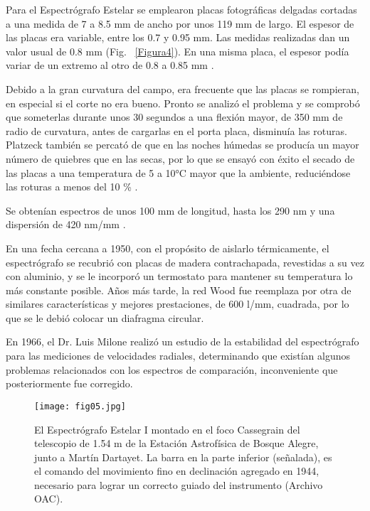 \documentclass[baaa]{baaa}
\begin{document}
Para el Espectrógrafo Estelar se emplearon placas fotográficas delgadas cortadas a una medida de 7 a 8.5 mm de ancho por unos 119 mm de largo. El espesor de las placas era variable, entre los 0.7 y 0.95 mm. Las medidas realizadas dan un valor usual de 0.8 mm (Fig. ~\ref{Figura4}). En una misma placa, el espesor podía variar de un extremo al otro de 0.8 a 0.85 mm \citep{1946RvAst..18..243G}. 

Debido a la gran curvatura del campo, era frecuente que las placas se rompieran, en especial si el corte no era bueno. Pronto se analizó el problema y se comprobó que someterlas durante unos 30 segundos a una flexión mayor, de 350 mm de radio de curvatura, antes de cargarlas en el porta placa, disminuía las roturas. Platzeck también se percató de que en las noches húmedas se producía un mayor número de quiebres que en las secas, por lo que se ensayó con éxito el secado de las placas a una temperatura de 5 a 10°C mayor que la ambiente, reduciéndose las roturas a menos del 10 \% \citep{1946RvAst..18..243G}.

Se obtenían espectros de unos 100 mm de longitud, hasta los 290 nm y una dispersión de 420 nm/mm \citep{1942RvA....14..207G}.

En una fecha cercana a 1950, con el propósito de aislarlo térmicamente, el espectrógrafo se recubrió con placas de madera contrachapada, revestidas a su vez con aluminio, y se le incorporó un termostato para mantener su temperatura lo más constante posible. Años más tarde, la red Wood fue reemplaza por otra de similares características y mejores prestaciones, de 600 l/mm, cuadrada, por lo que se le debió colocar un diafragma circular.

En 1966, el Dr. Luis Milone realizó un estudio de la estabilidad del espectrógrafo para las mediciones de velocidades radiales, determinando que existían algunos problemas relacionados con los espectros de comparación, inconveniente que posteriormente fue corregido\citep{milone}.

\begin{figure}[!t]
\centering
\texttt{[image: fig05.jpg]}
\caption{El Espectrógrafo Estelar I montado en el foco Cassegrain del telescopio de 1.54 m de la Estación Astrofísica de Bosque Alegre, junto a Martín Dartayet. La barra en la parte inferior (señalada), es el comando del movimiento fino en declinación agregado en 1944, necesario para lograr un correcto guiado del instrumento (Archivo OAC).}
\label{Figura5}
\end{figure}
\end{document}
